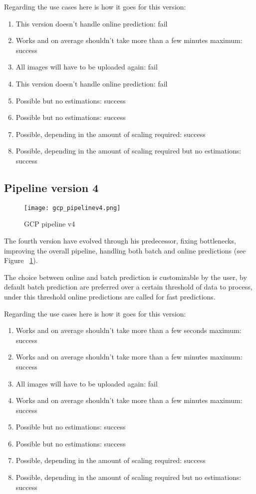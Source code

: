 Regarding the use cases here is how it goes for this version:
\begin{enumerate}
    \item This version doesn't handle online prediction: fail
    \item Works and on average shouldn't take more than a few minutes maximum: success
    \item All images will have to be uploaded again: fail
    \item This version doesn't handle online prediction: fail
    \item Possible but no estimations: success
    \item Possible but no estimations: success
    \item Possible, depending in the amount of scaling required: success
    \item Possible, depending in the amount of scaling required but no estimations: success
\end{enumerate}

\pagebreak\subsection{Pipeline version 4}
\begin{figure}[H]
    \centering
    \texttt{[image: gcp\_pipelinev4.png]}
	\caption{GCP pipeline v4}
	\label{fig:pipelinev4}
\end{figure}

The fourth version have evolved through his predecessor, fixing bottlenecks, improving the overall pipeline, handling both batch and online predictions (see Figure ~\ref{fig:pipelinev4}).

The choice between online and batch prediction is customizable by the user, by default batch prediction are preferred over a certain threshold of data to process, under this threshold online predictions are called for fast predictions.

\pagebreak
Regarding the use cases here is how it goes for this version:
\begin{enumerate}
    \item Works and on average shouldn't take more than a few seconds maximum: success
    \item Works and on average shouldn't take more than a few minutes maximum: success
    \item All images will have to be uploaded again: fail
    \item Works and on average shouldn't take more than a few minutes maximum: success
    \item Possible but no estimations: success
    \item Possible but no estimations: success
    \item Possible, depending in the amount of scaling required: success
    \item Possible, depending in the amount of scaling required but no estimations: success
\end{enumerate}

